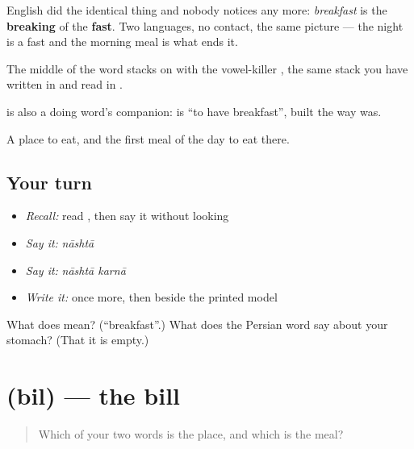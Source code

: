 English did the identical thing and nobody notices any more: \emph{breakfast} is the \textbf{breaking} of the \textbf{fast}. Two languages, no contact, the same picture — the night is a fast and the morning meal is what ends it.

The middle of the word stacks  on  with the vowel-killer , the same stack you have written in \textbf{} and read in \textbf{}.

\textbf{} is also a doing word's companion: \textbf{ } is \textquotedblleft{}to have breakfast\textquotedblright{}, built the way \textbf{ } was.

\begin{grammarlens}[title={What you've built}]
A place to eat, and the first meal of the day to eat there.
\end{grammarlens}

\subsection*{Your turn}
\begin{itemize}
\raggedright
  \item \emph{Recall:} read \textbf{}, then say it without looking
  \item \emph{Say it:} \emph{nāshtā}
  \item \emph{Say it:} \emph{nāshtā karnā}
  \item \emph{Write it:}  once more, then  beside the printed model
\end{itemize}

\begin{tcolorbox}[breakable,colback=teal!4,colframe=teal!35!black,title={Before you move on}]
What does  mean? (\textquotedblleft{}breakfast\textquotedblright{}.) What does the Persian word say about your stomach? (That it is empty.)
\end{tcolorbox}
\section[bil]{ (bil) — the bill}

\label{lesson:HI-C73-bill}



\begin{quote}
Which of your two words is the place, and which is the meal?
\end{quote}

